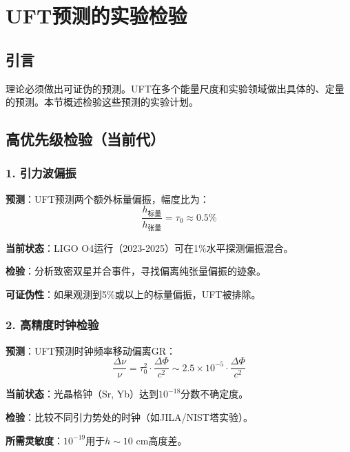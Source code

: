 \section{UFT预测的实验检验}
\label{sec:experimental_tests}

\subsection{引言}

理论必须做出可证伪的预测。UFT在多个能量尺度和实验领域做出具体的、定量的预测。本节概述检验这些预测的实验计划。

\subsection{高优先级检验（当前代）}

\subsubsection{1. 引力波偏振}

\begin{test}
\textbf{预测}：UFT预测两个额外标量偏振，幅度比为：
\begin{equation}
    \frac{h_{\text{标量}}}{h_{\text{张量}}} = \tau_0 \approx 0.5\%
\end{equation}

\textbf{当前状态}：LIGO O4运行（2023-2025）可在1\%水平探测偏振混合。

\textbf{检验}：分析致密双星并合事件，寻找偏离纯张量偏振的迹象。

\textbf{可证伪性}：如果观测到5\%或以上的标量偏振，UFT被排除。
\end{test}

\subsubsection{2. 高精度时钟检验}

\begin{test}[光钟红移和时间膨胀]
\textbf{预测}：UFT预测时钟频率移动偏离GR：
\begin{equation}
    \frac{\Delta \nu}{\nu} = \tau_0^2 \cdot \frac{\Delta \Phi}{c^2} \sim 2.5 \times 10^{-5} \cdot \frac{\Delta \Phi}{c^2}
\end{equation}

\textbf{当前状态}：光晶格钟（Sr, Yb）达到$10^{-18}$分数不确定度。

\textbf{检验}：比较不同引力势处的时钟（如JILA/NIST塔实验）。

\textbf{所需灵敏度}：$10^{-19}$用于$h \sim 10$ cm高度差。
\end{test}

